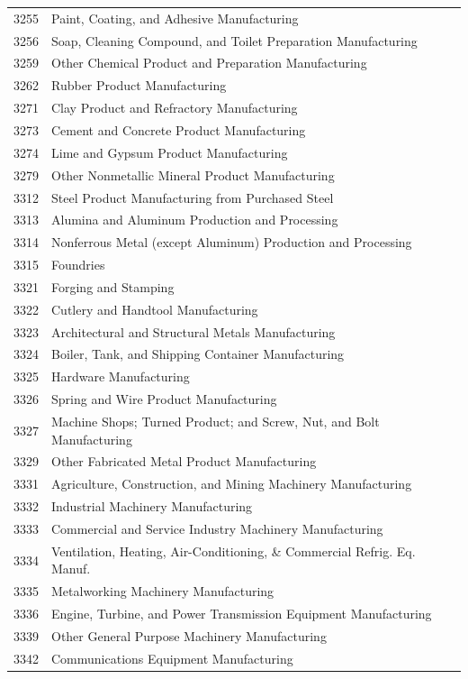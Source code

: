 \begin{spacing}{1}
\begin{longtable}{cl}
3255 &	Paint, Coating, and Adhesive Manufacturing \\
3256 &	Soap, Cleaning Compound, and Toilet Preparation Manufacturing \\
3259 &	Other Chemical Product and Preparation Manufacturing \\
3262 &	Rubber Product Manufacturing \\
3271 &	Clay Product and Refractory Manufacturing \\
3273 &	Cement and Concrete Product Manufacturing \\
3274 &	Lime and Gypsum Product Manufacturing \\
3279 &	Other Nonmetallic Mineral Product Manufacturing \\
3312 &	Steel Product Manufacturing from Purchased Steel \\
3313 &	Alumina and Aluminum Production and Processing \\
3314 &	Nonferrous Metal (except Aluminum) Production and Processing \\
3315 &	Foundries \\
3321 &	Forging and Stamping \\
3322 &	Cutlery and Handtool Manufacturing \\
3323 &	Architectural and Structural Metals Manufacturing \\
3324 &	Boiler, Tank, and Shipping Container Manufacturing \\
3325 &	Hardware Manufacturing \\
3326 &	Spring and Wire Product Manufacturing \\
3327 &	Machine Shops; Turned Product; and Screw, Nut, and Bolt Manufacturing \\
3329 &	Other Fabricated Metal Product Manufacturing \\
3331 &	Agriculture, Construction, and Mining Machinery Manufacturing \\
3332 &	Industrial Machinery Manufacturing \\
3333 &	Commercial and Service Industry Machinery Manufacturing \\
3334 &	Ventilation, Heating, Air-Conditioning, \& Commercial Refrig. Eq. Manuf. \\
3335 &	Metalworking Machinery Manufacturing \\
3336 &	Engine, Turbine, and Power Transmission Equipment Manufacturing \\
3339 &	Other General Purpose Machinery Manufacturing \\
3342 &	Communications Equipment Manufacturing \\

\end{longtable}
\end{spacing}

